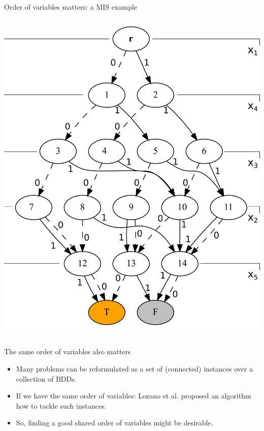 \documentclass[10pt, xcolor=svgnames]{beamer}
\begin{document}
\begin{frame}[label={sec:orgffd0237}]{Order of variables matters: a MIS example}
\begin{columns}
\begin{column}{0.55\columnwidth}
\includegraphics[height=0.7\textheight]{./img/BDDsampleRep2.png}
\end{column}
\end{columns}
\end{frame}
\begin{frame}[label={sec:orga70fe75}]{The \alert{same} order of variables also matters}
\begin{itemize}
\item Many problems can be reformulated as a set of (connected) instances
over a collection of BDDs.
\item If we have the same order of variables: Lozano et al. proposed an algorithm
how to tackle such instances.
\item So, finding a good shared order of variables might be desirable.
\end{itemize}
\end{frame}
\end{document}
